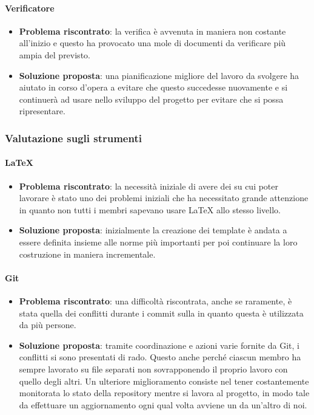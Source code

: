 		\paragraph{Verificatore}
			\begin{itemize}
				\item \textbf{Problema riscontrato}: la verifica è avvenuta in maniera non costante all'inizio e questo ha provocato una mole di documenti da verificare più ampia del previsto.
				\item \textbf{Soluzione proposta}: una pianificazione migliore del lavoro da svolgere ha aiutato in corso d'opera a evitare che questo succedesse nuovamente e si continuerà ad usare nello sviluppo del progetto per evitare che si possa ripresentare.
			\end{itemize}

	\subsubsection{Valutazione sugli strumenti}

		\paragraph{\LaTeX}
			\begin{itemize}
				\item \textbf{Problema riscontrato}: la necessità iniziale di avere dei  su cui poter lavorare è stato uno dei problemi iniziali che ha necessitato grande attenzione in quanto non tutti i membri sapevano usare {\LaTeX} allo stesso livello.
				\item \textbf{Soluzione proposta}: inizialmente la creazione dei template è andata a essere definita insieme alle norme più importanti per poi continuare la loro costruzione in maniera incrementale.
			\end{itemize}

		\paragraph{Git}
			\begin{itemize}
				\item \textbf{Problema riscontrato}: una difficoltà riscontrata, anche se raramente, è stata quella dei conflitti durante i commit sulla  in quanto questa è utilizzata da più persone.
				\item \textbf{Soluzione proposta}: tramite coordinazione e azioni varie fornite da Git, i conflitti si sono presentati di rado. Questo anche perché ciascun membro ha sempre lavorato su file separati non sovrapponendo il proprio lavoro con quello degli altri. Un ulteriore miglioramento consiste nel tener costantemente monitorata lo stato della repository mentre si lavora al progetto, in modo tale da effettuare un aggiornamento ogni qual volta avviene un  da un'altro di noi.
			\end{itemize}

